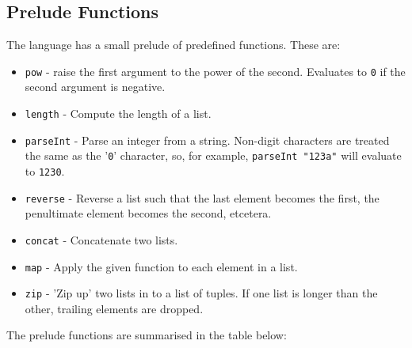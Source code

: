 \documentclass{article}
\begin{document}
\subsection{Prelude Functions}
The language has a small prelude of predefined functions. These are:
\begin{itemize}
    \item \texttt{pow} - raise the first argument to the power of the second. Evaluates to \texttt{0} if the second argument is negative.
    \item \texttt{length} - Compute the length of a list.
    \item \texttt{parseInt} - Parse an integer from a string. Non-digit characters are treated the same as the '\texttt{0}' character, so, for example, \texttt{parseInt "123a"} will evaluate to \texttt{1230}.
    \item \texttt{reverse} - Reverse a list such that the last element becomes the first, the penultimate element becomes the second, etcetera.
    \item \texttt{concat} - Concatenate two lists.
    \item \texttt{map} - Apply the given function to each element in a list.
    \item \texttt{zip} - 'Zip up' two lists in to a list of tuples. If one list is longer than the other, trailing elements are dropped.
\end{itemize}
The prelude functions are summarised in the table below:
\\\\
\end{document}
